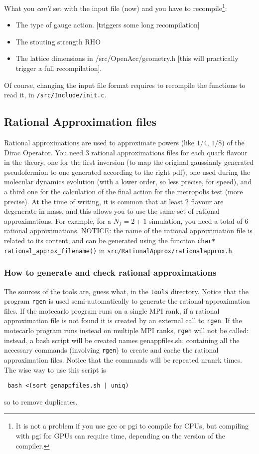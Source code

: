 What you \emph{can't} set with the input file (now) and you have to
recompile\footnote{ It is not a problem if you use gcc or pgi to compile for 
    CPUs, but compiling with pgi for GPUs can require time, depending on the
version of the compiler.}:
\begin{itemize}
    \item The type of gauge action. [triggers some long recompilation]
    \item The stouting strength RHO 
    \item The lattice dimensions in /src/OpenAcc/geometry.h [this will
        practically trigger a full recompilation].
\end{itemize}
Of course, changing the input file format requires to recompile the functions 
to read it, in \verb|/src/Include/init.c|.

\subsection{ Rational Approximation files}
Rational approximations are used to approximate powers (like $1/4$,
$1/8$) of the Dirac Operator.
You need $3$ rational approximations files for each quark flavour in the
theory, one for the first inversion (to map the original
gaussianly generated pseudofermion to one generated according to the
right pdf), one used during the molecular dynamics evolution (with a
lower order, so less precise, for speed), and a third one for the
calculation of the final action for the metropolis test (more
precise). At the time of writing, it is common that at least 2 flavour are 
degenerate in mass, and this allows you to use the same set of rational
approximations. For example, for a $N_f=2+1$ simulation, you need a total
of 6 rational approximations.
NOTICE: the name of the rational approximation file is related to
its content, and can be generated using the function
\verb|char* rational_approx_filename()| in
\verb|src/RationalApprox/rationalapprox.h|.

\subsubsection{ How to generate and check rational approximations}
The sources of the tools are, guess what, in  the \verb|tools| directory.
Notice that the program \verb|rgen| is used semi-automatically to generate the 
rational approximation files. If the motecarlo program runs on a single MPI rank, 
if a rational approximation file is not found it is created by an external call to \verb|rgen|.
If the motecarlo program runs instead on multiple MPI ranks, \verb|rgen| will not be called: 
instead, a bash script will be created names {\sf genappfiles.sh}, containing all the necessary commands (involving \verb|rgen|)
to create and cache the rational approximation files. Notice that the commands 
will be repeated {\sf nranrk} times. The wise way to use this script is 
\begin{verbatim}
 bash <(sort genappfiles.sh | uniq)
\end{verbatim}
so to remove duplicates.

